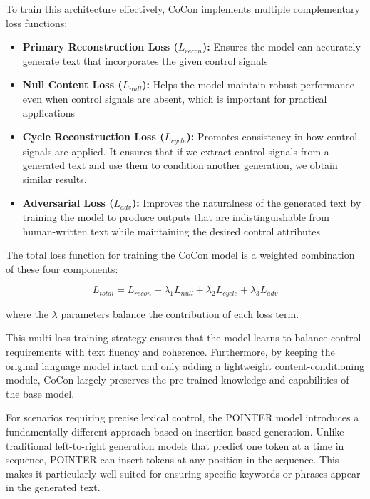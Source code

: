 To train this architecture effectively, CoCon implements multiple complementary loss functions:

\begin{itemize}
   \item \textbf{Primary Reconstruction Loss ($L_{recon}$):} Ensures the model can accurately generate text that incorporates the given control signals
   \item \textbf{Null Content Loss ($L_{null}$):} Helps the model maintain robust performance even when control signals are absent, which is important for practical applications
   \item \textbf{Cycle Reconstruction Loss ($L_{cycle}$):} Promotes consistency in how control signals are applied. It ensures that if we extract control signals from a generated text and use them to condition another generation, we obtain similar results.
   \item \textbf{Adversarial Loss ($L_{adv}$):} Improves the naturalness of the generated text by training the model to produce outputs that are indistinguishable from human-written text while maintaining the desired control attributes
\end{itemize}

The total loss function for training the CoCon model is a weighted combination of these four components:

\begin{equation}
    L_{total} = L_{recon} + \lambda_1 L_{null} + \lambda_2 L_{cycle} + \lambda_3 L_{adv}
\end{equation}

where the $\lambda$ parameters balance the contribution of each loss term.

This multi-loss training strategy ensures that the model learns to balance control requirements with text fluency and coherence.
Furthermore, by keeping the original language model intact and only adding a lightweight content-conditioning module, CoCon largely preserves the pre-trained knowledge and capabilities of the base model.

For scenarios requiring precise lexical control, the POINTER model \cite{zhang-etal-2020-pointer} introduces a fundamentally different approach based on insertion-based generation. 
Unlike traditional left-to-right generation models that predict one token at a time in sequence, POINTER can insert tokens at any position in the sequence. 
This makes it particularly well-suited for ensuring specific keywords or phrases appear in the generated text.

